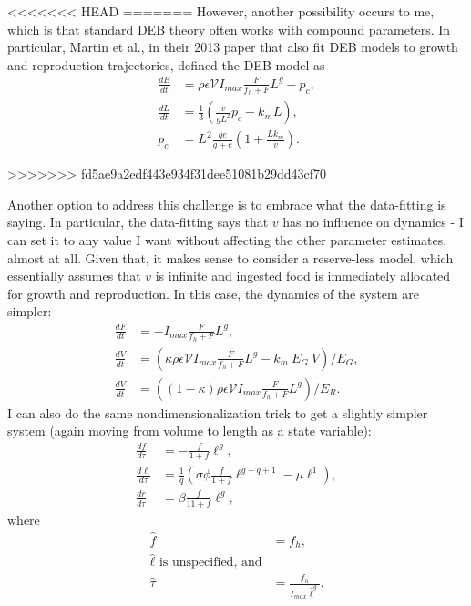 \documentclass[12pt,reqno,final,pdftex]{amsart}\usepackage[]{graphicx}\usepackage[]{color}
\theoremstyle{plain}
\numberwithin{equation}{part}
\begin{document}
<<<<<<< HEAD
=======
However, another possibility occurs to me, which is that standard DEB theory often works with compound parameters.
In particular, Martin et al., in their 2013 paper that also fit DEB models to growth and reproduction trajectories, defined the DEB model as
\begin{align}
  \frac{dE}{dt} &= \rho \epsilon \mathcal{V} I_{max} \frac{F}{f_h+F} L^g - p_c, \\
  \frac{dL}{dt} &= \frac{1}{3}\left(\frac{v}{gL^2} p_c - k_m L\right), \\
p_c &= L^2 \frac{g e}{g + e}\left(1 + \frac{L k_m}{v}\right).
\end{align}


>>>>>>> fd5ae9a2edf443e934f31dee51081b29dd43cf70



Another option to address this challenge is to embrace what the data-fitting is saying.
In particular, the data-fitting says that $v$ has no influence on dynamics - I can set it to any value I want without affecting the other parameter estimates, almost at all.
Given that, it makes sense to consider a reserve-less model, which essentially assumes that $v$ is infinite and ingested food is immediately allocated for growth and reproduction.
In this case, the dynamics of the system are simpler:
\begin{align}
\frac{dF}{dt} &= -I_{max} \frac{F}{f_h+F} L^g, \\
\frac{dV}{dt} &= \left(\kappa \rho \epsilon \mathcal{V} I_{max} \frac{F}{f_h+F} L^g - k_m~E_G~V\right)/E_G, \\
\frac{dV}{dt} &= \left((1-\kappa) \rho \epsilon \mathcal{V} I_{max} \frac{F}{f_h+F} L^g\right)/E_R.
\end{align}
I can also do the same nondimensionalization trick to get a slightly simpler system (again moving from volume to length as a state variable):
\begin{align}
\frac{df}{d\tau}&=-\frac{f}{1+f} \ell^g, \\
\frac{d\ell}{d\tau}&=\frac{1}{q}\left(\sigma \phi \frac{f}{1+f}\ell^{g-q+1}-\mu \ell^1\right), \\
\frac{dr}{d\tau}&=\beta\frac{f}{11+f}\ell^g,
\end{align}
where
\begin{align}
\hat{f} &= f_h, \\
\hat{\ell} \text{ is unspecified, and} \\
\hat{\tau} &= \frac{f_h}{I_{max}\hat{\ell}^g}.
\end{align}
\end{document}
